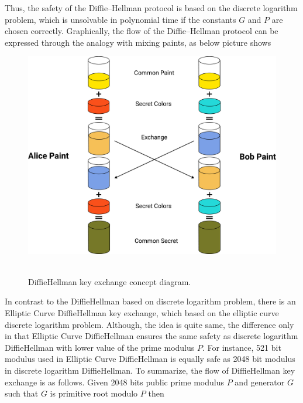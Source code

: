 \documentclass[12pt,letterpaper,oneside,reqno]{amsart}
\numberwithin{equation}{section}
\begin{document}
    Thus, the safety of the Diffie--Hellman protocol is based on the discrete logarithm problem, which is unsolvable
    in polynomial time if the constants $G$ and $P$ are chosen correctly.
    Graphically, the flow of the Diffie--Hellman protocol can be expressed through the
    analogy with mixing paints, as below picture shows
    \begin{figure}[H]
        \centering
        \includegraphics[width=1\textwidth]{Pictures/Diffie_Hellman_keyexchange_concept_diagram}
        ~\caption{Diffie\textendash Hellman key exchange concept diagram.}\label{fig:figure4}
    \end{figure}
    In contrast to the Diffie\textendash Hellman based on discrete logarithm problem, there is an Elliptic Curve Diffie\textendash Hellman
    key exchange, which based on the elliptic curve discrete logarithm problem.
    Although, the idea is quite same, the difference only in that Elliptic Curve Diffie\textendash Hellman ensures the same safety
    as discrete logarithm Diffie\textendash Hellman with lower value of the prime modulus $P$.
    For instance, 521 bit modulus used in Elliptic Curve Diffie\textendash Hellman is equally safe as 2048 bit modulus in
    discrete logarithm Diffie\textendash Hellman.
    To summarize, the flow of Diffie\textendash Hellman key exchange is as follows.
    Given 2048 bits public prime modulus $P$ and generator $G$ such that $G$ is primitive root modulo $P$ then
\end{document}
